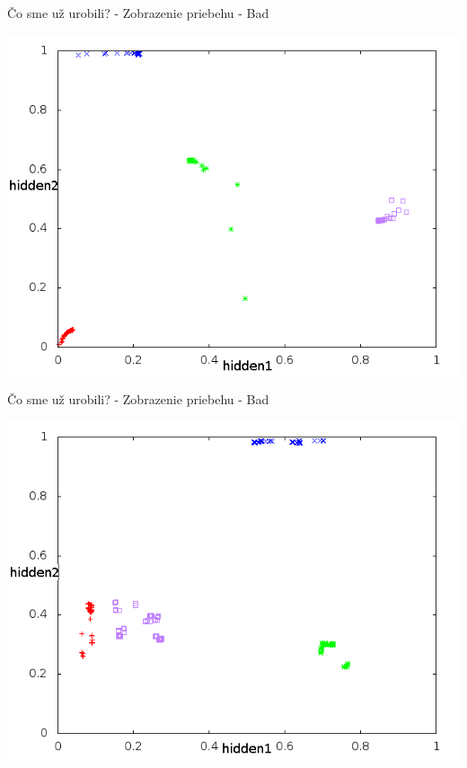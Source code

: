 \documentclass[xcolor=dvipsnames]{beamer}
\begin{document}
    
\begin{frame}{Čo sme už urobili? - Zobrazenie priebehu - Bad}
    \begin{center}
      \includegraphics[scale=0.5]{img/tazisko.png}
    \end{center} 
\end{frame}
\begin{frame}{Čo sme už urobili? - Zobrazenie priebehu - Bad}
    \begin{center}
      \includegraphics[scale=0.5]{img/non-convergent.png}
    \end{center} 
\end{frame}
\end{document}
